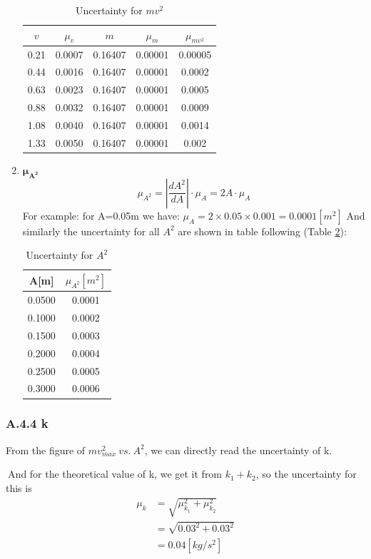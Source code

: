 \documentclass[11pt,a4paper]{article}
\begin{document}
\begin{enumerate}
\begin{table}[h]
        \centering
        \begin{tabular}{c|c|c|c|c}
            $v$  & $\mu_v$ & $m$     & $\mu_m$& $\mu_{mv^2}$ \\\hline  
        0.21 & 0.0007 & 0.16407 & 0.00001 & 0.00005 \\
        0.44 & 0.0016 & 0.16407 & 0.00001 & 0.0002  \\
        0.63 & 0.0023 & 0.16407 & 0.00001 & 0.0005  \\
        0.88 & 0.0032 & 0.16407 & 0.00001 & 0.0009  \\
        1.08 & 0.0040 & 0.16407 & 0.00001 & 0.0014  \\
        1.33 & 0.0050 & 0.16407 & 0.00001 & 0.002  
        \end{tabular}
        \caption{Uncertainty for $mv^2$}
        \label{Uncertainty for mv2}
        \end{table}
    \item $\mathbf{\mu_{A^2}}$\\
    $$\mu_{A^2}=\left| \frac{dA^2}{dA}\right|\cdot \mu_A=2A\cdot \mu_A$$
    For example: for A=0.05m we have: $\mu_A=2\times 0.05\times 0.001=0.0001[m^2]$
    And similarly the uncertainty for all $A^2$ are shown in table following (Table \ref{unceratinya2}):
   \begin{table}[H]
    \centering
        \begin{tabular}{c|c}
          A[m]   &   $\mu_{A^2}[m^2]$     \\\hline
        0.0500 & 0.0001 \\
        0.1000  & 0.0002 \\
        0.1500 & 0.0003 \\
        0.2000  & 0.0004 \\
        0.2500 & 0.0005 \\
        0.3000  & 0.0006\\
        \end{tabular}
        \caption{Uncertainty for $A^2$}
        \label{unceratinya2}
    \end{table}
\end{enumerate}
\newpage
\subsubsection*{A.4.4 k}
\qquad From the figure of $mv_{max}^2\ vs.\ A^2$, we can directly read the uncertainty of k.\par
$\ $And for the theoretical value of k, we get it from $k_1+k_2$, so the uncertainty for this is 
\begin{equation*}
    \begin{split}
    \mu_k&=\sqrt{\mu_{k_1}^2+\mu_{k_2}^2}\\
    &=\sqrt{0.03^2+0.03^2}\\
    &=0.04[kg/s^2]
    \end{split}
\end{equation*}
\end{document}
